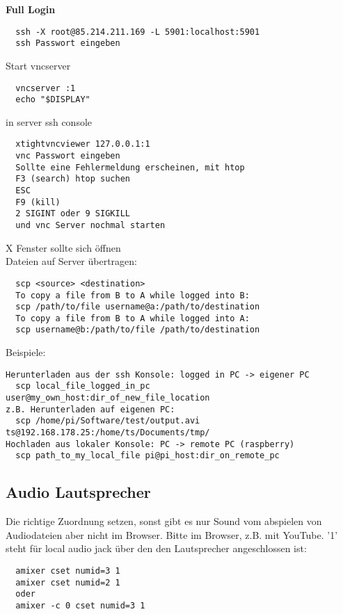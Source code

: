 \textbf{Full Login}
\begin{verbatim}
  ssh -X root@85.214.211.169 -L 5901:localhost:5901
  ssh Passwort eingeben
\end{verbatim}
Start vncserver
\begin{verbatim}
  vncserver :1
  echo "$DISPLAY"
\end{verbatim}
in server ssh console
\begin{verbatim}
  xtightvncviewer 127.0.0.1:1
  vnc Passwort eingeben
  Sollte eine Fehlermeldung erscheinen, mit htop
  F3 (search) htop suchen 
  ESC
  F9 (kill)
  2 SIGINT oder 9 SIGKILL
  und vnc Server nochmal starten
\end{verbatim}
X Fenster sollte sich öffnen\\

Dateien auf Server übertragen:
\begin{verbatim}
  scp <source> <destination>
  To copy a file from B to A while logged into B:
  scp /path/to/file username@a:/path/to/destination
  To copy a file from B to A while logged into A:
  scp username@b:/path/to/file /path/to/destination
\end{verbatim}
Beispiele:
\begin{verbatim}
Herunterladen aus der ssh Konsole: logged in PC -> eigener PC
  scp local_file_logged_in_pc user@my_own_host:dir_of_new_file_location
z.B. Herunterladen auf eigenen PC:
  scp /home/pi/Software/test/output.avi ts@192.168.178.25:/home/ts/Documents/tmp/
Hochladen aus lokaler Konsole: PC -> remote PC (raspberry)
  scp path_to_my_local_file pi@pi_host:dir_on_remote_pc
\end{verbatim}


\subsection{Audio Lautsprecher}

Die richtige Zuordnung setzen, sonst gibt es nur Sound vom 
abspielen von Audiodateien aber nicht im Browser. Bitte im 
Browser, z.B. mit YouTube. '1' steht für local audio jack über 
den den Lautsprecher angeschlossen ist:
\begin{verbatim}
  amixer cset numid=3 1
  amixer cset numid=2 1
  oder
  amixer -c 0 cset numid=3 1
\end{verbatim}

